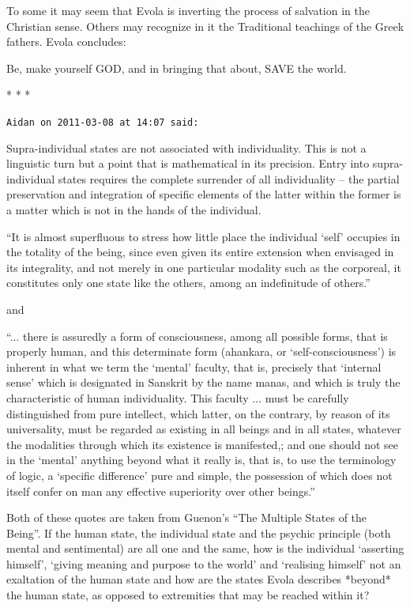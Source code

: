 To some it may seem that Evola is inverting the process of salvation in the Christian sense. Others may recognize in it the Traditional teachings of the Greek fathers. Evola concludes:

Be, make yourself GOD, and in bringing that about, SAVE the world.


\begin{center}* * *\end{center}

\begin{footnotesize}
\begin{sffamily}
\texttt{Aidan on 2011-03-08 at 14:07 said:}

Supra-individual states are not associated with individuality. This is not a linguistic turn but a point that is mathematical in its precision. Entry into supra-individual states requires the complete surrender of all individuality -- the partial preservation and integration of specific elements of the latter within the former is a matter which is not in the hands of the individual.

``It is almost superfluous to stress how little place the individual `self' occupies in the totality of the being, since even given its entire extension when envisaged in its integrality, and not merely in one particular modality such as the corporeal, it constitutes only one state like the others, among an indefinitude of others.''

and

``... there is assuredly a form of consciousness, among all possible forms, that is properly human, and this determinate form (ahankara, or `self-consciousness') is inherent in what we term the `mental' faculty, that is, precisely that `internal sense' which is designated in Sanskrit by the name manas, and which is truly the characteristic of human individuality. This faculty ... must be carefully distinguished from pure intellect, which latter, on the contrary, by reason of its universality, must be regarded as existing in all beings and in all states, whatever the modalities through which its existence is manifested,; and one should not see in the `mental' anything beyond what it really is, that is, to use the terminology of logic, a `specific difference' pure and simple, the possession of which does not itself confer on man any effective superiority over other beings.''

Both of these quotes are taken from Guenon's ``The Multiple States of the Being''. If the human state, the individual state and the psychic principle (both mental and sentimental) are all one and the same, how is the individual `asserting himself', `giving meaning and purpose to the world' and `realising himself' not an exaltation of the human state and how are the states Evola describes *beyond* the human state, as opposed to extremities that may be reached within it?


\end{sffamily}
\end{footnotesize}
